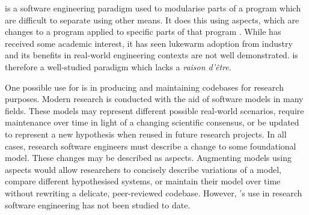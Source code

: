 
    \Aop{} is a software engineering paradigm used to modularise parts of a
    program which are difficult to separate using other means. It does this
    using aspects, which are changes to a program applied to specific parts of
    that program . While \aop{} has received some academic interest, it has seen
    lukewarm adoption from industry and its benefits in real-world engineering
    contexts are not well demonstrated. \Aop{} is therefore a well-studied
    paradigm which lacks a \emph{raison d'\^etre}.
    
    One possible use for \aop{} is in producing and maintaining codebases for
    research purposes. Modern research is conducted with the aid of software
    models in many fields. These models may represent different possible
    real-world scenarios, require maintenance over time in light of a changing
    scientific consensus, or be updated to represent a new hypothesis when
    reused in future research projects. In all cases, research software
    engineers must describe a change to some foundational model. These changes
    may be described as aspects. Augmenting models using aspects would allow
    researchers to concisely describe variations of a model, compare different
    hypothesised systems, or maintain their model over time without rewriting a
    delicate, peer-reviewed codebase. However, \aop{}'s use in research software
    engineering has not been studied to date.





